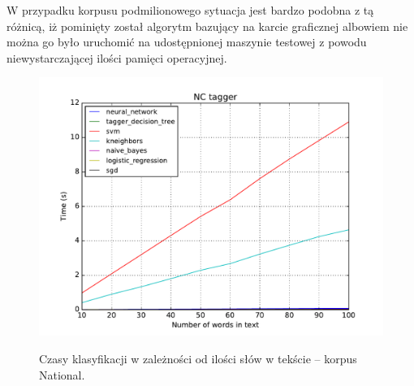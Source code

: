 W przypadku korpusu podmilionowego sytuacja jest bardzo podobna z tą różnicą, iż pominięty został algorytm bazujący na karcie graficznej albowiem nie można go było uruchomić na udostępnionej maszynie testowej z powodu niewystarczającej ilości pamięci operacyjnej.

\begin{figure}[H]
	\centering
	\includegraphics[scale=0.8]{charts/czasy_nc.pdf}
	\label{Rysunek}
	\caption{Czasy klasyfikacji w zależności od ilości słów w tekście -- korpus National.}
\end{figure}
